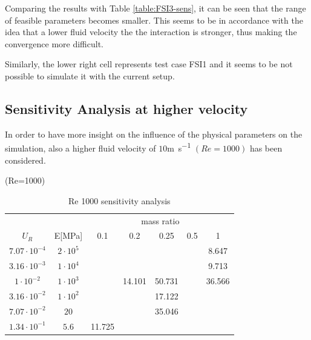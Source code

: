 Comparing the results with Table \ref{table:FSI3-sens}, it can be seen that the range of feasible parameters becomes smaller. This seems to be in accordance with the idea that a lower fluid velocity the the interaction is stronger, thus making the convergence more difficult.

Similarly, the lower right cell represents test case FSI1 and it seems to be not possible to simulate it with the current setup.


\subsection{Sensitivity Analysis at higher velocity}

In order to have more insight on the influence of the physical parameters on the simulation, also a higher fluid velocity of $10$\si{m.s^{-1}} $(Re=1000)$ has been considered.

 (Re=1000)

%
\begin{table}[!htb]
	\begin{center}
		\begin{tabular}{ c | c | c c c c c |} 
			&  & \multicolumn{5}{c}{mass ratio} \\
			
			$U_R$ & E[\si{MPa}] & 0.1 & 0.2 & 0.25 & 0.5 & 1 \\
			\hline
			
			$7.07\cdot 10^{-4}$ & $2\cdot 10^{5}$ & \cellcolor{green!10} & \cellcolor{green!10} & \cellcolor{green!10} & \cellcolor{green!10} & \cellcolor{green!10}8.647 \\
			$3.16\cdot 10^{-3}$ & $1\cdot 10^{4}$ & \cellcolor{green!10} & \cellcolor{green!10} & \cellcolor{green!10} & \cellcolor{green!10} & \cellcolor{green!10}9.713 \\        
			$1\cdot 10^{-2}$ & $1\cdot 10^{3}$ & \cellcolor{green!10} & \cellcolor{green!10}14.101 & \cellcolor{green!10}50.731 & \cellcolor{green!10} & \cellcolor{green!10}36.566 \\
			$3.16\cdot 10^{-2}$ & $1\cdot 10^{2}$ & \cellcolor{green!10} & \cellcolor{green!10} & \cellcolor{green!10}17.122 & \cellcolor{red!10} & \cellcolor{red!10} \\
			$7.07\cdot 10^{-2}$ & $20$ & \cellcolor{green!10} & \cellcolor{green!10} & \cellcolor{green!10}35.046 & \cellcolor{red!10} & \cellcolor{red!10} \\
			$1.34\cdot 10^{-1}$ & $5.6$ & \cellcolor{green!10}11.725 & \cellcolor{red!10} & \cellcolor{red!10} & \cellcolor{red!10} & \cellcolor{red!10} \\
			\hline                        
		\end{tabular}
	\end{center}
	\caption{Re 1000 sensitivity analysis}
	\label{table:Re1000-sens}
\end{table}

